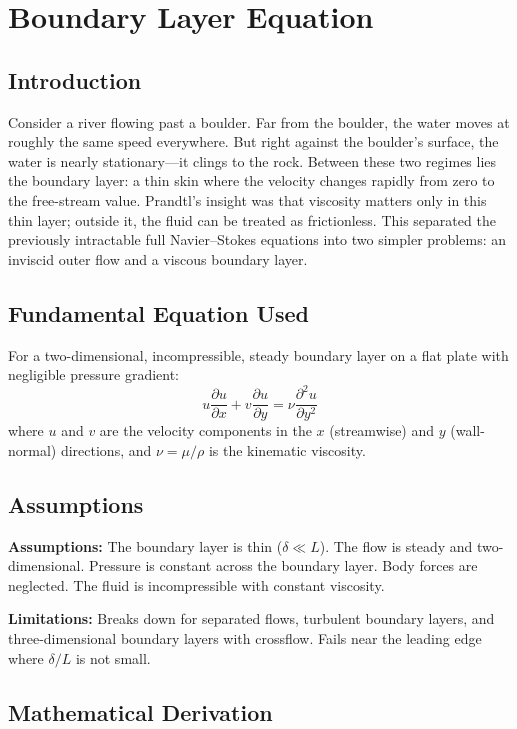 \chapter{Boundary Layer Equation}

\section*{Introduction}

Consider a river flowing past a boulder. Far from the boulder, the water moves at roughly the same speed everywhere. But right against the boulder's surface, the water is nearly stationary---it clings to the rock. Between these two regimes lies the boundary layer: a thin skin where the velocity changes rapidly from zero to the free-stream value. Prandtl's insight was that viscosity matters only in this thin layer; outside it, the fluid can be treated as frictionless. This separated the previously intractable full Navier--Stokes equations into two simpler problems: an inviscid outer flow and a viscous boundary layer.
\section*{Fundamental Equation Used}

For a two-dimensional, incompressible, steady boundary layer on a flat plate with negligible pressure gradient:
\[
u\frac{\partial u}{\partial x} + v\frac{\partial u}{\partial y} = \nu \frac{\partial^2 u}{\partial y^2}
\]
where $u$ and $v$ are the velocity components in the $x$ (streamwise) and $y$ (wall-normal) directions, and $\nu = \mu/\rho$ is the kinematic viscosity.
\section*{Assumptions}

\textbf{Assumptions:} The boundary layer is thin ($\delta \ll L$). The flow is steady and two-dimensional. Pressure is constant across the boundary layer. Body forces are neglected. The fluid is incompressible with constant viscosity.


\textbf{Limitations:} Breaks down for separated flows, turbulent boundary layers, and three-dimensional boundary layers with crossflow. Fails near the leading edge where $\delta/L$ is not small.


\section*{Mathematical Derivation}

